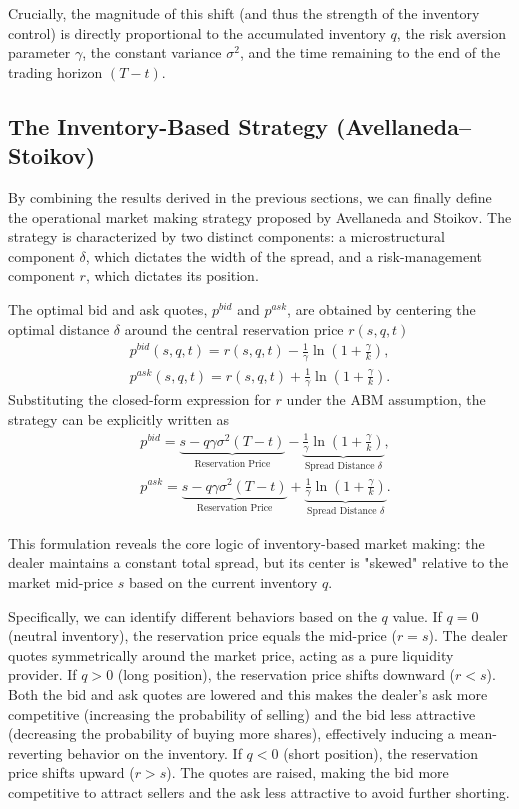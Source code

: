 Crucially, the magnitude of this shift (and thus the strength of the inventory control) is directly proportional to the accumulated inventory $q$, the risk aversion parameter $\gamma$, the constant variance $\sigma^2$, and the time remaining to the end of the trading horizon $(T-t)$.

\subsection{The Inventory-Based Strategy (Avellaneda--Stoikov)}\label{sec:classical-policy}
By combining the results derived in the previous sections, we can finally define the operational market making strategy proposed by Avellaneda and Stoikov. The strategy is characterized by two distinct components: a microstructural component $\delta$, which dictates the width of the spread, and a risk-management component $r$, which dictates its position.

The optimal bid and ask quotes, $p^{bid}$ and $p^{ask}$, are obtained by centering the optimal distance $\delta$ around the central reservation price $r(s,q,t)$
\begin{align*}
    p^{bid}(s,q,t) = r(s,q,t) - \frac{1}{\gamma} \ln \left( 1 + \frac{\gamma}{k} \right),\\
    p^{ask}(s,q,t) = r(s,q,t) + \frac{1}{\gamma} \ln \left( 1 + \frac{\gamma}{k} \right).
\end{align*}
Substituting the closed-form expression for $r$ under the ABM assumption, the strategy can be explicitly written as
\begin{align*}
    &p^{bid} = \underbrace{s - q\gamma\sigma^2(T-t)}_{\text{Reservation Price}} - \underbrace{\frac{1}{\gamma} \ln \left( 1 + \frac{\gamma}{k} \right)}_{\text{Spread Distance } \delta},\\
    &p^{ask} = \underbrace{s - q\gamma\sigma^2(T-t)}_{\text{Reservation Price}} + \underbrace{\frac{1}{\gamma} \ln \left( 1 + \frac{\gamma}{k} \right)}_{\text{Spread Distance } \delta}.
\end{align*}

This formulation reveals the core logic of inventory-based market making: the dealer maintains a constant total spread, but its center is "skewed" relative to the market mid-price $s$ based on the current inventory $q$. 

Specifically, we can identify different behaviors based on the $q$ value. If $q=0$ (neutral inventory), the reservation price equals the mid-price ($r=s$). The dealer quotes symmetrically around the market price, acting as a pure liquidity provider. If $q>0$ (long position), the reservation price shifts downward ($r < s$). Both the bid and ask quotes are lowered and this makes the dealer's ask more competitive (increasing the probability of selling) and the bid less attractive (decreasing the probability of buying more shares), effectively inducing a mean-reverting behavior on the inventory. If $q<0$ (short position), the reservation price shifts upward ($r > s$). The quotes are raised, making the bid more competitive to attract sellers and the ask less attractive to avoid further shorting.

